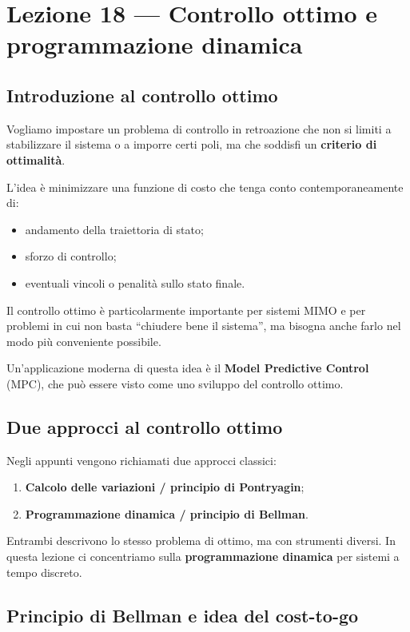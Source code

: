 \chapter{Lezione 18 --- Controllo ottimo e programmazione dinamica}

\section{Introduzione al controllo ottimo}

Vogliamo impostare un problema di controllo in retroazione che non si limiti a
stabilizzare il sistema o a imporre certi poli, ma che soddisfi un
\textbf{criterio di ottimalità}.

L'idea è minimizzare una funzione di costo che tenga conto contemporaneamente di:
\begin{itemize}
    \item andamento della traiettoria di stato;
    \item sforzo di controllo;
    \item eventuali vincoli o penalità sullo stato finale.
\end{itemize}

Il controllo ottimo è particolarmente importante per sistemi MIMO e per problemi
in cui non basta ``chiudere bene il sistema'', ma bisogna anche farlo nel modo
più conveniente possibile.

Un'applicazione moderna di questa idea è il \textbf{Model Predictive Control} (MPC),
che può essere visto come uno sviluppo del controllo ottimo.

\section{Due approcci al controllo ottimo}

Negli appunti vengono richiamati due approcci classici:
\begin{enumerate}
    \item \textbf{Calcolo delle variazioni / principio di Pontryagin};
    \item \textbf{Programmazione dinamica / principio di Bellman}.
\end{enumerate}

Entrambi descrivono lo stesso problema di ottimo, ma con strumenti diversi.
In questa lezione ci concentriamo sulla \textbf{programmazione dinamica} per sistemi
a tempo discreto.

\section{Principio di Bellman e idea del cost-to-go}


